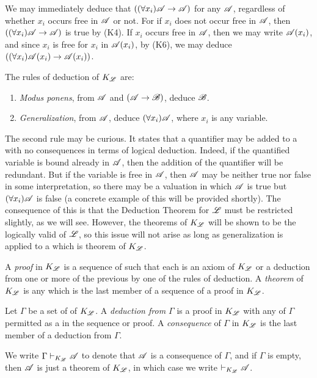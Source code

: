 \note{} We may immediately deduce that \(((\forall x_i) \mathscr{A} \rightarrow \mathscr{A})\) for any \wf{} \(\mathscr{A}\), regardless of whether \(x_i\) occurs free in \(\mathscr{A}\) or not. For if \(x_i\) does not occur free in \(\mathscr{A}\), then \(((\forall x_i) \mathscr{A} \rightarrow \mathscr{A})\) is true by (K4). If \(x_i\) occurs free in \(\mathscr{A}\), then we may write \(\mathscr{A}(x_i)\), and since \(x_i\) is free for \(x_i\) in \(\mathscr{A}(x_i)\), by (K6), we may deduce \(((\forall x_i) \mathscr{A}(x_i) \rightarrow \mathscr{A}(x_i))\).

The rules of deduction of \(K_{\mathscr{L}}\) are:
\begin{enumerate}
  \item \textit{Modus ponens}, from \(\mathscr{A}\) and \((\mathscr{A} \rightarrow \mathscr{B})\), deduce \(\mathscr{B}\).
  \item \textit{Generalization}, from \(\mathscr{A}\), deduce \((\forall x_i)\mathscr{A}\), where \(x_i\) is any variable.
\end{enumerate}

The second rule may be curious. It states that a quantifier may be added to a \wf{} with no consequences in terms of logical deduction. Indeed, if the quantified variable is bound already in \(\mathscr{A}\), then the addition of the quantifier will be redundant. But if the variable is free in \(\mathscr{A}\), then \(\mathscr{A}\) may be neither true nor false in some interpretation, so there may be a valuation in which \(\mathscr{A}\) is true but \((\forall x_i) \mathscr{A}\) is false (a concrete example of this will be provided shortly). The consequence of this is that the Deduction Theorem for \(\mathscr{L}\) must be restricted slightly, as we will see. However, the theorems of \(K_{\mathscr{L}}\) will be shown to be the logically valid \wfs{} of \(\mathscr{L}\), so this issue will not arise as long as generalization is applied to a \wf{} which is theorem of \(K_{\mathscr{L}}\).

\setcounter{definition}{1}
\begin{definition}
  A \textit{proof} in \(K_{\mathscr{L}}\) is a sequence of \wfs{} such that each \wf{} is an axiom of \(K_{\mathscr{L}}\) or a deduction from one or more of the previous \wfs{} by one of the rules of deduction. A \textit{theorem} of \(K_{\mathscr{L}}\) is any \wf{} which is the last member of a sequence of a proof in \(K_{\mathscr{L}}\).

  Let \(\Gamma\) be a set of \wfs{} of \(K_{\mathscr{L}}\). A \textit{deduction from \(\Gamma\)} is a proof in \(K_{\mathscr{L}}\) with any \wf{} of \(\Gamma\) permitted as a \wf{} in the sequence or proof. A \textit{consequence} of \(\Gamma\) in \(K_{\mathscr{L}}\) is the last member of a deduction from \(\Gamma\). 

  We write \(\Gamma \vdash_{{K_{\mathscr{L}}}} \mathscr{A}\) to denote that \(\mathscr{A}\) is a consequence of \(\Gamma\), and if \(\Gamma\) is empty, then \(\mathscr{A}\) is just a theorem of \(K_{\mathscr{L}}\), in which case we write \(\vdash_{{K_{\mathscr{L}}}} \mathscr{A}\).
\end{definition}

